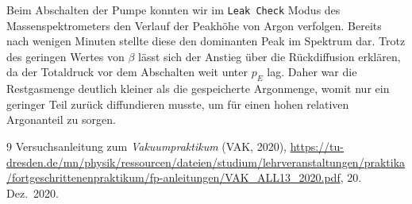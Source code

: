 \documentclass[german, parskip=full]{scrartcl}
\begin{document}
Beim Abschalten der Pumpe konnten wir im \texttt{Leak Check} Modus des Massenspektrometers den Verlauf der Peakhöhe von Argon verfolgen. Bereits nach wenigen Minuten stellte diese den dominanten Peak im Spektrum dar. Trotz des geringen Wertes von $\beta$ lässt sich der Anstieg über die Rückdiffusion erklären, da der Totaldruck vor dem Abschalten weit unter $p_E$ lag. Daher war die Restgasmenge deutlich kleiner als die gespeicherte Argonmenge, womit nur ein geringer Teil zurück diffundieren musste, um für einen hohen relativen Argonanteil zu sorgen.
\begin{thebibliography}{9}
 Versuchsanleitung zum \emph{Vakuumpraktikum} (VAK, 2020), \url{https://tu-dresden.de/mn/physik/ressourcen/dateien/studium/lehrveranstaltungen/praktika/fortgeschrittenenpraktikum/fp-anleitungen/VAK_ALL13_2020.pdf}, 20.\,Dez.~2020.
\end{thebibliography}
\end{document}
